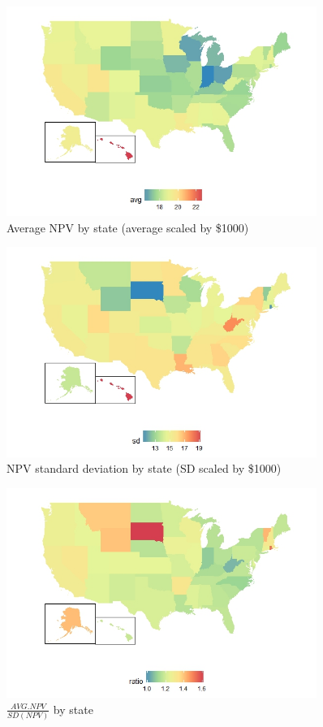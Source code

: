 \documentclass[12 pt]{uncw_thesis}
\theoremstyle{plain}
\theoremstyle{remark}
\theoremstyle{definition}
\begin{document}
\begin{figure}
	\includegraphics[width=0.9\textwidth]{images/MapAvg.jpeg}
	\caption{Average NPV by state (average scaled by \$1000)}
	\label{fig:MapAvg}
\end{figure}
\begin{figure}
	\includegraphics[width=0.9\textwidth]{images/MapSD.jpeg}
	\caption{NPV standard deviation by state (SD scaled by \$1000)}
	\label{fig:MapSD}
\end{figure}
\begin{figure}
	\includegraphics[width=0.9\textwidth]{images/MapSR.jpeg}
	\caption{$\frac{AVG. NPV}{SD(NPV)}$ by state}
	\label{fig:MapRatio}
\end{figure}
\end{document}
